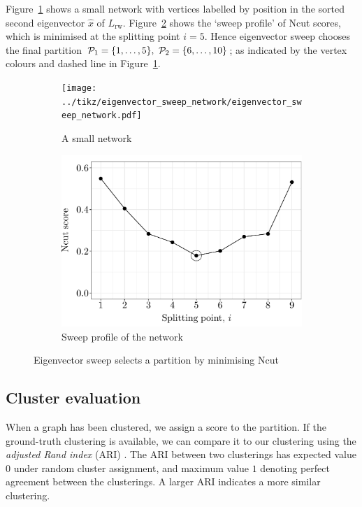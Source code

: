 Figure~\ref{fig:eigenvector_sweep_network} shows a small network with vertices labelled by position in the sorted second eigenvector $\hat{x}$ of $L_\mathrm{rw}$. Figure~\ref{fig:eigenvector_sweep_profile} shows the `sweep profile' of Ncut scores, which is minimised at the splitting point $i=5$. Hence eigenvector sweep chooses the final partition $\mathcal{P}_1 = \{1, \ldots,5\}, \ \mathcal{P}_2 = \{6, \ldots,10\}$; as indicated by the vertex colours and dashed line in Figure~\ref{fig:eigenvector_sweep_network}.
%
%
\begin{figure}[H]
	\begin{subfigure}{.49\textwidth}
		\centering
		\texttt{[image: ../tikz/eigenvector\_sweep\_network/eigenvector\_sweep\_network.pdf]}
		\caption{A small network}
		\label{fig:eigenvector_sweep_network}
	\end{subfigure}
	\begin{subfigure}{.49\textwidth}
		\centering
		\includegraphics[scale=0.4,draft=false]{../../results/eigenvector_sweep/eigenvector_sweep_scores.pdf}
		\caption{Sweep profile of the network}
		\label{fig:eigenvector_sweep_profile}
	\end{subfigure}
	\caption{Eigenvector sweep selects a partition by minimising Ncut}
	\label{fig:eigenvector_sweep}
\end{figure}
%




\subsection{Cluster evaluation}

When a graph has been clustered, we assign a score to the partition. If the ground-truth clustering is available, we can compare it to our clustering using the \emph{adjusted Rand index} (ARI) \cite{hubert1985comparing}. The ARI between two clusterings has expected value $0$ under random cluster assignment, and maximum value $1$ denoting perfect agreement between the clusterings. A larger ARI indicates a more similar clustering.


